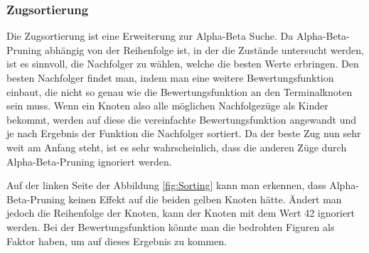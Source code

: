 \documentclass[12pt,a4paper,bibliography=totocnumbered,listof=totocnumbered]{article}
\begin{document}
\subsubsection{Zugsortierung}
\label{chap:Zugsortierung}
Die Zugsortierung ist eine Erweiterung zur Alpha-Beta Suche.
Da Alpha-Beta-Pruning abhängig von der Reihenfolge ist, in der die Zustände untersucht werden, ist es sinnvoll,
die Nachfolger zu wählen, welche die besten Werte erbringen. Den besten Nachfolger findet man, indem man eine
weitere Bewertungsfunktion einbaut, die nicht so genau wie die Bewertungsfunktion an den Terminalknoten sein muss. 
Wenn ein Knoten also alle möglichen Nachfolgezüge als Kinder bekommt, werden auf diese die vereinfachte Bewertungsfunktion
angewandt und je nach Ergebnis der Funktion die Nachfolger sortiert. Da der beste Zug nun
sehr weit am Anfang steht, ist es sehr wahrscheinlich, dass die anderen Züge durch Alpha-Beta-Pruning ignoriert werden.
\cite{KuenstlicheIntelligenzNorvig}

Auf der linken Seite der Abbildung \ref{fig:Sorting} kann man erkennen, dass Alpha-Beta-Pruning keinen Effekt 
auf die beiden gelben Knoten hätte. Ändert man jedoch die Reihenfolge der Knoten, kann der Knoten mit dem Wert 42
ignoriert werden. Bei der Bewertungsfunktion könnte man die bedrohten Figuren als Faktor haben, um auf dieses Ergebnis zu kommen.
\end{document}
